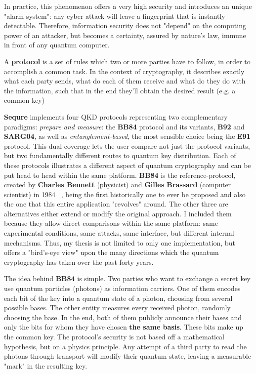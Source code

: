 \documentclass[12pt, a4paper]{article}
\begin{document}
In practice, this phenomenon offers a very high security and introduces an unique "alarm system": any cyber attack will leave a fingerprint that is instantly detectable. Therefore, information security does not "depend" on the computing power of an attacker, but becomes a certainty, assured by nature's law, immune in front of any quantum computer.

A \textbf{protocol} is a set of rules which two or more parties have to follow, in order to accomplish a common task. In the context of cryptography, it describes exactly what each party sends, what do each of them receive and what do they do with the information, such that in the end they'll obtain the desired result (e.g. a common key)

\textbf{Sequre} implements four QKD protocols representing two complementary paradigms: \textit{prepare and measure}: the  \textbf{BB84} protocol and its variants, \textbf{B92} and \textbf{SARG04}, as well as \textit{entanglement-based}, the most sensible choice being the \textbf{E91} protocol.  This dual coverage lets the user compare not just the protocol variants, but two fundamentally different routes to quantum key distribution. Each of these protocols illustrates a different aspect of quantum cryptography and can be put head to head within the same platform. \textbf{BB84} is the reference-protocol, created by \textbf{Charles Bennett} (physicist) and \textbf{Gilles Brassard} (computer scientist) in 1984 ~\cite{bb84}, being the first historically one to ever be proposed and also the one that this entire application "revolves" around. The other three are alternatives either extend or modify the original approach. I included them because they allow direct comparisons within the same platform: same experimental conditions, same attacks, same interface, but different internal mechanisms. Thus, my thesis is not limited to only one implementation, but offers a "bird's-eye view" upon the many directions which the quantum cryptography has taken over the past forty years.

The idea behind \textbf{BB84} is simple. Two parties who want to exchange a secret key use quantum particles (photons) as information carriers. One of them encodes each bit of the key into a quantum state of a photon, choosing from several possible bases. The other entity measures every received photon, randomly choosing the base. In the end, both of them publicly announce their bases and only the bits for whom they have chosen \textbf{the same basis}. These bits make up the common key. The protocol's security is not based off a mathematical hypothesis, but on a physics principle. Any attempt of a third party to read the photons through transport will modify their quantum state, leaving a measurable "mark" in the resulting key. 
\end{document}

